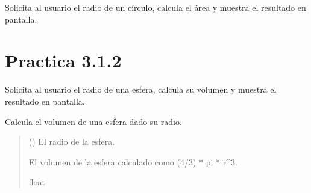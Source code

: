 \documentclass[letterpaper,10pt,spanish]{sphinxmanual}
\begin{document}

\begin{fulllineitems}
\label{\detokenize{pr3:pr3.1_1.main}}
\pysigstartsignatures
{}
\pysigstopsignatures
\sphinxAtStartPar
Solicita al usuario el radio de un círculo, calcula el área
y muestra el resultado en pantalla.

\end{fulllineitems}



\section{Practica 3.1.2}
\label{\detokenize{pr3:module-pr3.1_2}}\label{\detokenize{pr3:practica-3-1-2}}

\begin{fulllineitems}
\label{\detokenize{pr3:pr3.1_2.main}}
\pysigstartsignatures
{}
\pysigstopsignatures
\sphinxAtStartPar
Solicita al usuario el radio de una esfera, calcula su volumen
y muestra el resultado en pantalla.

\end{fulllineitems}


\begin{fulllineitems}
\label{\detokenize{pr3:pr3.1_2.volumen_esfera}}
\pysigstartsignatures
{}
\pysigstopsignatures
\sphinxAtStartPar
Calcula el volumen de una esfera dado su radio.
\begin{quote}\begin{description}
\sphinxAtStartPar
{} () \textendash{} El radio de la esfera.

\sphinxAtStartPar
El volumen de la esfera calculado como (4/3) * pi * r\textasciicircum{}3.

\sphinxAtStartPar
float

\end{description}\end{quote}

\end{fulllineitems}
\end{document}
